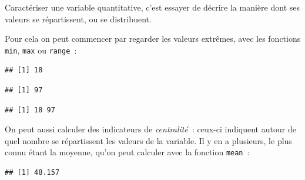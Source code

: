 \documentclass[12pt,]{book}
\newenvironment{Shaded}{\begin{snugshade}}{\end{snugshade}}
\newcommand{\KeywordTok}[1]{\textcolor[rgb]{0.27,0.27,0.27}{\textbf{#1}}}
\newcommand{\NormalTok}[1]{#1}
\newcommand{\OperatorTok}[1]{\textcolor[rgb]{0.43,0.43,0.43}{\textbf{#1}}}
\begin{document}
Caractériser une variable quantitative, c'est essayer de décrire la manière dont ses valeurs se répartissent, ou se distribuent.

Pour cela on peut commencer par regarder les valeurs extrêmes, avec les fonctions \texttt{min}, \texttt{max} ou \texttt{range}~:

\begin{Shaded}
\end{Shaded}

\begin{verbatim}
## [1] 18
\end{verbatim}

\begin{Shaded}
\end{Shaded}

\begin{verbatim}
## [1] 97
\end{verbatim}

\begin{Shaded}
\end{Shaded}

\begin{verbatim}
## [1] 18 97
\end{verbatim}

On peut aussi calculer des indicateurs de \emph{centralité}~: ceux-ci indiquent autour de quel nombre se répartissent les valeurs de la variable. Il y en a plusieurs, le plus connu étant la moyenne, qu'on peut calculer avec la fonction \texttt{mean}~:

\begin{Shaded}
\end{Shaded}

\begin{verbatim}
## [1] 48.157
\end{verbatim}
\end{document}
